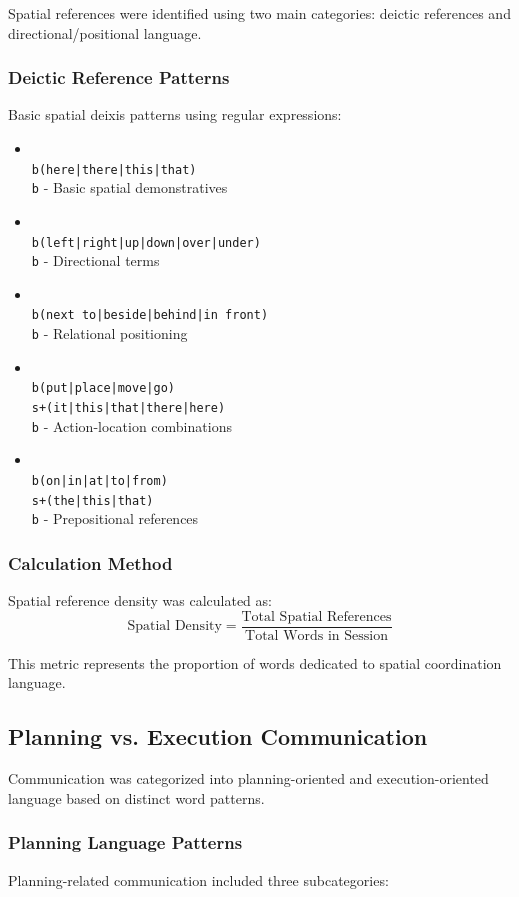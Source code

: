 Spatial references were identified using two main categories: deictic references and directional/positional language.

\subsubsection{Deictic Reference Patterns}
Basic spatial deixis patterns using regular expressions:
\begin{itemize}
\item \texttt{\\b(here|there|this|that)\\b} - Basic spatial demonstratives
\item \texttt{\\b(left|right|up|down|over|under)\\b} - Directional terms
\item \texttt{\\b(next to|beside|behind|in front)\\b} - Relational positioning
\item \texttt{\\b(put|place|move|go)\\s+(it|this|that|there|here)\\b} - Action-location combinations
\item \texttt{\\b(on|in|at|to|from)\\s+(the|this|that)\\b} - Prepositional references
\end{itemize}

\subsubsection{Calculation Method}
Spatial reference density was calculated as:
$$\text{Spatial Density} = \frac{\text{Total Spatial References}}{\text{Total Words in Session}}$$

This metric represents the proportion of words dedicated to spatial coordination language.

\subsection{Planning vs. Execution Communication}

Communication was categorized into planning-oriented and execution-oriented language based on distinct word patterns.

\subsubsection{Planning Language Patterns}
Planning-related communication included three subcategories:

